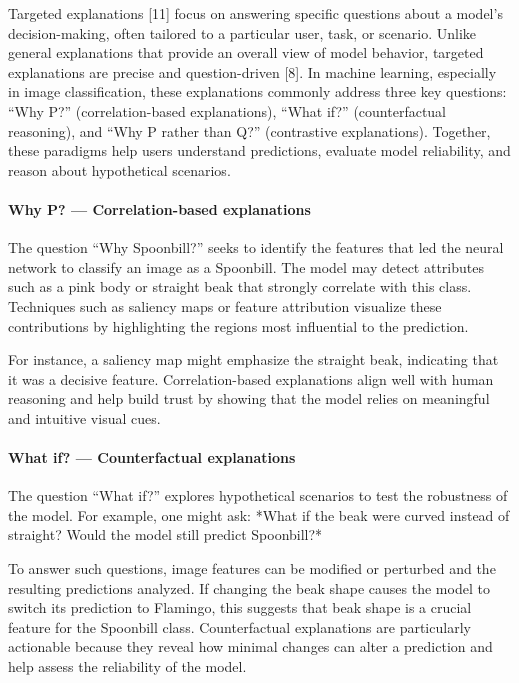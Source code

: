 \documentclass{article}
\renewcommand{\cite}[1]{[#1]}
\begin{document}
Targeted explanations \cite{11} focus on answering specific questions about a model’s decision-making, often tailored to a particular user, task, or scenario. Unlike general explanations that provide an overall view of model behavior, targeted explanations are precise and question-driven \cite{8}. In machine learning, especially in image classification, these explanations commonly address three key questions: 
``Why P?'' (correlation-based explanations), 
``What if?'' (counterfactual reasoning), and 
``Why P rather than Q?'' (contrastive explanations).  
Together, these paradigms help users understand predictions, evaluate model reliability, and reason about hypothetical scenarios.

\paragraph{Why P? — Correlation-based explanations}
The question ``Why Spoonbill?'' seeks to identify the features that led the neural network to classify an image as a Spoonbill. The model may detect attributes such as a pink body or straight beak that strongly correlate with this class. Techniques such as saliency maps or feature attribution visualize these contributions by highlighting the regions most influential to the prediction. 

For instance, a saliency map might emphasize the straight beak, indicating that it was a decisive feature. Correlation-based explanations align well with human reasoning and help build trust by showing that the model relies on meaningful and intuitive visual cues.

\paragraph{What if? — Counterfactual explanations}
The question ``What if?'' explores hypothetical scenarios to test the robustness of the model. For example, one might ask: *What if the beak were curved instead of straight? Would the model still predict Spoonbill?*  

To answer such questions, image features can be modified or perturbed and the resulting predictions analyzed. If changing the beak shape causes the model to switch its prediction to Flamingo, this suggests that beak shape is a crucial feature for the Spoonbill class. Counterfactual explanations are particularly actionable because they reveal how minimal changes can alter a prediction and help assess the reliability of the model.
\end{document}
